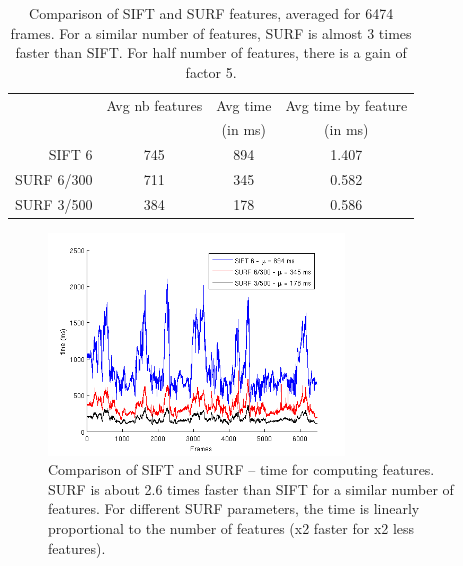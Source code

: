 \begin{table}[h]
 \begin{center}
 \begin{tabular}{r|ccc}
 & Avg nb features & Avg time & Avg time by feature \\
 &  & (in ms) & (in ms) \\
 \hline
 SIFT 6 & 745 & 894 & 1.407\\
 SURF 6/300 & 711  & 345  & 0.582 \\
 SURF 3/500 & 384 & 178 & 0.586 \\
 \end{tabular}
\caption{Comparison of SIFT and SURF features, averaged for 6474 frames. For a similar number of features, SURF is almost 3 times faster than SIFT. For half number of features, there is a gain of factor 5.}
\label{tab:stats_features}
\end{center}
\end{table}

\clearpage

\begin{figure}[H]
\begin{center}
\includegraphics[width=0.7\textwidth]{figures/stats_features_time}
\caption{Comparison of SIFT and SURF -- time for computing features. SURF is about 2.6 times faster than SIFT for a similar number of features. For different SURF parameters, the time is linearly proportional to the number of features (x2 faster for x2 less features).}
\end{center}
\end{figure}

